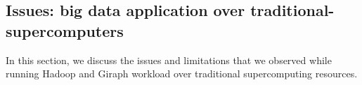 \documentclass[conference]{IEEEtran}
\begin{document}
 

\subsection {Issues: big data application over traditional-supercomputers}
In this section, we discuss the issues and limitations that we observed while running Hadoop and Giraph workload over traditional supercomputing resources. 
\end{document}
